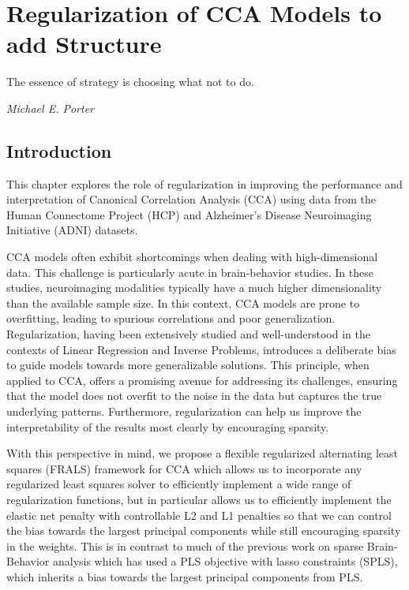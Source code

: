 \graphicspath{{chapters/regularization}}
\chapter{Regularization of CCA Models to add Structure}\label{chap:als}
\minitoc

\epigraph{The essence of strategy is choosing what not to do.}{\textit{Michael E. Porter}}
\section{Introduction}\label{sec:introduction}

This chapter explores the role of regularization in improving the performance and interpretation of Canonical
Correlation Analysis (CCA) using data from the Human Connectome Project (HCP) and Alzheimer's Disease Neuroimaging Initiative (ADNI) datasets.

CCA models often exhibit shortcomings when dealing with high-dimensional data.
This challenge is particularly acute in brain-behavior studies.
In these studies, neuroimaging modalities typically have a much higher dimensionality than the available sample size.
In this context, CCA models are prone to overfitting, leading to spurious correlations and poor generalization.
Regularization, having been extensively studied and well-understood in the contexts of Linear Regression and Inverse Problems, introduces a deliberate bias to guide models towards more generalizable solutions.
This principle, when applied to CCA, offers a promising avenue for addressing its challenges, ensuring that the model does not overfit to the noise in the data but captures the true underlying patterns.
Furthermore, regularization can help us improve the interpretability of the results most clearly by encouraging sparsity.

With this perspective in mind, we propose a flexible regularized alternating least squares (FRALS) framework for CCA which allows us to incorporate any regularized least squares solver to efficiently implement a wide range of regularization functions, but in particular allows us to efficiently implement the elastic net penalty with controllable L2 and L1 penalties so that we can control the bias towards the largest principal components while still encouraging sparsity in the weights.
This is in contrast to much of the previous work on sparse Brain-Behavior analysis which has used a PLS objective with lasso constraints (SPLS), which inherits a bias towards the largest principal components from PLS.

